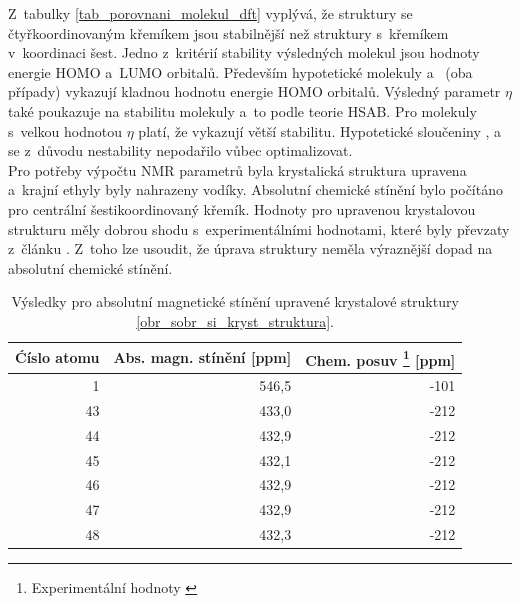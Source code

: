\documentclass[
  printed, %
  table,   %
  lof,     %
  lot,     %
  oneside,
]{fithesis3}
\begin{document}
Z~tabulky \ref{tab_porovnani_molekul_dft} vyplývá, že struktury se čtyřkoordinovaným křemíkem jsou stabilnější než struktury s~křemíkem v~koordinaci šest. Jedno z~kritérií stability výsledných molekul jsou hodnoty energie HOMO a~LUMO orbitalů. Především hypotetické molekuly  a~ (oba případy) vykazují kladnou hodnotu energie HOMO orbitalů. Výsledný parametr $\eta$ také poukazuje na stabilitu molekuly a~to podle teorie HSAB. Pro molekuly s~velkou hodnotou $\eta$ platí, že vykazují větší stabilitu. Hypotetické sloučeniny  ,  a~ se z~důvodu nestability nepodařilo vůbec optimalizovat. \\
Pro potřeby výpočtu NMR parametrů byla krystalická struktura upravena a~krajní ethyly byly nahrazeny vodíky. Absolutní chemické stínění bylo počítáno pro centrální šestikoordinovaný křemík. Hodnoty pro upravenou krystalovou strukturu měly dobrou shodu s~experimentálními hodnotami, které byly převzaty z~článku \cite{C3NJ00721A}. Z~toho lze usoudit, že úprava struktury neměla výraznější dopad na absolutní chemické stínění. 

\begin{table}[htbp]
\begin{minipage}{\textwidth}
\caption{Výsledky pro absolutní magnetické stínění upravené krystalové struktury \ref{obr_sobr_si_kryst_struktura}.}
\begin{center}
\begin{tabular}{|r|r|r|}
\hline
\multicolumn{1}{|l|}{Ćíslo atomu} & \multicolumn{1}{l|}{Abs. magn. stínění [ppm]} & \multicolumn{1}{l|}{Chem. posuv \footnote{Experimentální hodnoty \cite{1316862}} [ppm]} \\ \hline
1 & 546,5 & -101 \\ \hline
43 & 433,0 & -212 \\ \hline
44 & 432,9 & -212 \\ \hline
45 & 432,1 & -212 \\ \hline
46 & 432,9 & -212 \\ \hline
47 & 432,9 & -212 \\ \hline
48 & 432,3 & -212 \\ \hline
\end{tabular}
\end{center}
\label{vysledky_abs_magn_stineni}
\end{minipage}
\end{table}

  
\end{document}
